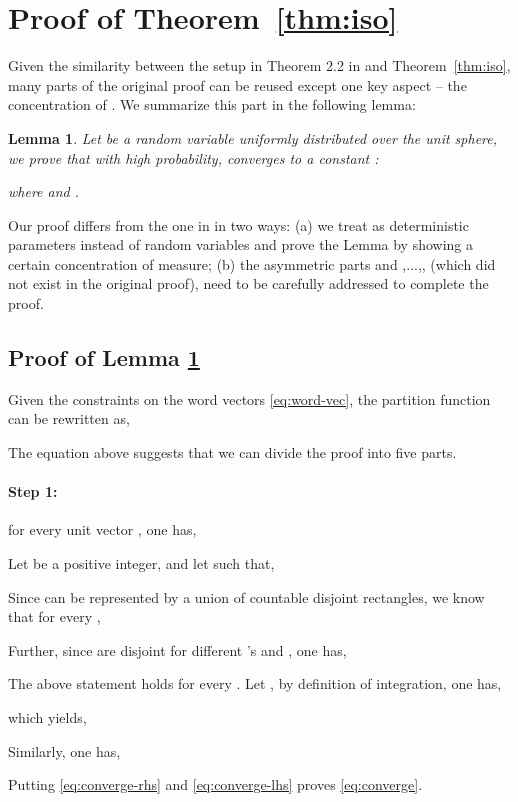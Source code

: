 \documentclass{article} \usepackage{acl2017,times}
\newtheorem{lemma}[theorem]{Lemma}
\newenvironment{proof}[1][Proof]{\begin{trivlist}
\item[\hskip \labelsep {\bfseries #1}]}{\end{trivlist}}
\begin{document}
\section{Proof of Theorem~\ref{thm:iso}}
\label{app:iso}


Given the similarity between the setup in Theorem 2.2 in \citep{arora2015rand} and Theorem~\ref{thm:iso}, many parts of the original proof can be reused except one key aspect -- the concentration of . We summarize this part in the following lemma:
\begin{lemma}
\label{lemma}
Let  be a random variable uniformly distributed over the unit sphere, we prove that with high probability,  converges to a constant :
    
where  and .
\end{lemma}
Our proof differs from the one in \citep{arora2015rand} in two ways: (a) we treat   as deterministic parameters instead of random variables and prove the Lemma by showing a certain concentration of measure;  (b) the asymmetric parts  and ,...,, (which did not exist in the original proof),   need to be carefully addressed to complete the proof.

\subsection{Proof of Lemma \ref{lemma}}
Given the constraints on the word vectors \eqref{eq:word-vec}, the partition function  can be rewritten as,

The equation above suggests that we can divide the proof into five parts.

\paragraph{Step 1:} for every unit vector , one has,

\begin{proof}
    Let  be a positive integer, and let  such that,
    
    Since  can be represented by a union of countable disjoint rectangles, we know that for every ,
    
    Further, since  are disjoint for different 's and , one has,
    
   The above statement holds for every . Let , by definition of integration, one has,
   
    which yields,
    
    Similarly, one has,
    
    Putting \eqref{eq:converge-rhs} and \eqref{eq:converge-lhs} proves \eqref{eq:converge}.
\end{proof}
\end{document}
